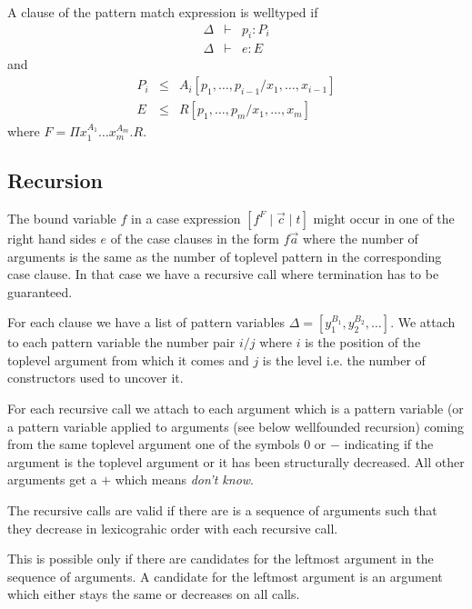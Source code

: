 A clause of the pattern match expression is welltyped if
$$
\begin{array}{lll}
    \Delta &\vdash& p_i : P_i
    \\
    \Delta &\vdash& e : E
\end{array}
$$
%
and
%
$$
\begin{array}{lll}
    P_i &\le& A_i[p_1,\ldots,p_{i-1} / x_1,\ldots,x_{i-1}]
    \\
    E   &\le& R[p_1,\ldots,p_m / x_1,\ldots,x_m]
\end{array}
$$
%
where $F = \Pi x_1^{A_1} \ldots x_m^{A_m}. R$.






\subsection{Recursion}

The bound variable $f$ in a case expression $[f^F \mid \vec c \mid t]$ might
occur in one of the right hand sides $e$ of the case clauses in the form $f \vec
a$ where the number of arguments is the same as the number of toplevel pattern
in the corresponding case clause. In that case we have a recursive call where
termination has to be guaranteed.

For each clause we have a list of pattern variables $\Delta = [y_1^{B_1},
y_2^{B_2}, \ldots ]$. We attach to each pattern variable the number pair $i/j$
where $i$ is the position of the toplevel argument from which it comes and
$j$ is the level i.e. the number of constructors used to uncover it.

For each recursive call we attach to each argument which is a pattern variable
(or a pattern variable applied to arguments (see below wellfounded recursion)
coming from the same toplevel argument one of the symbols  $0$ or $-$ indicating
if the argument is the toplevel argument or it has been structurally decreased.
All other arguments get a $+$ which means \emph{don't know}.

The recursive calls are valid if there are is a sequence of arguments such that
they decrease in lexicograhic order with each recursive call.

This is possible only if there are candidates for the leftmost argument in the
sequence of arguments. A candidate for the leftmost argument is an argument
which either stays the same or decreases on all calls.

